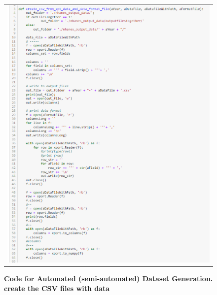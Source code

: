 \begin{figure}[!htb]
\begin{tabular}{c}
\includegraphics[scale=1]{images/datasetgenerationcode/code-writing-data-one-file-at-a-time.png} \\
\end{tabular}
\caption{\textbf{Code for Automated (semi-automated) Dataset Generation. create the CSV files with data}}
\label{automated-data-csv}
\vspace{0.25cm}
\end{figure}

